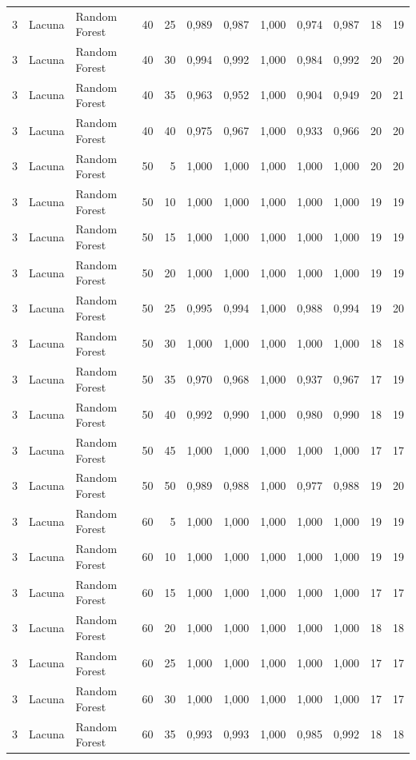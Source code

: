 \begin{longtable}{@{}rllrrrrrrrrr@{}}
3 & Lacuna & Random Forest & 40 & 25 & 0,989 & 0,987 & 1,000 & 0,974 & 0,987 & 18 & 19 \\
3 & Lacuna & Random Forest & 40 & 30 & 0,994 & 0,992 & 1,000 & 0,984 & 0,992 & 20 & 20 \\
3 & Lacuna & Random Forest & 40 & 35 & 0,963 & 0,952 & 1,000 & 0,904 & 0,949 & 20 & 21 \\
3 & Lacuna & Random Forest & 40 & 40 & 0,975 & 0,967 & 1,000 & 0,933 & 0,966 & 20 & 20 \\
3 & Lacuna & Random Forest & 50 & 5 & 1,000 & 1,000 & 1,000 & 1,000 & 1,000 & 20 & 20 \\
3 & Lacuna & Random Forest & 50 & 10 & 1,000 & 1,000 & 1,000 & 1,000 & 1,000 & 19 & 19 \\
3 & Lacuna & Random Forest & 50 & 15 & 1,000 & 1,000 & 1,000 & 1,000 & 1,000 & 19 & 19 \\
3 & Lacuna & Random Forest & 50 & 20 & 1,000 & 1,000 & 1,000 & 1,000 & 1,000 & 19 & 19 \\
3 & Lacuna & Random Forest & 50 & 25 & 0,995 & 0,994 & 1,000 & 0,988 & 0,994 & 19 & 20 \\
3 & Lacuna & Random Forest & 50 & 30 & 1,000 & 1,000 & 1,000 & 1,000 & 1,000 & 18 & 18 \\
3 & Lacuna & Random Forest & 50 & 35 & 0,970 & 0,968 & 1,000 & 0,937 & 0,967 & 17 & 19 \\
3 & Lacuna & Random Forest & 50 & 40 & 0,992 & 0,990 & 1,000 & 0,980 & 0,990 & 18 & 19 \\
3 & Lacuna & Random Forest & 50 & 45 & 1,000 & 1,000 & 1,000 & 1,000 & 1,000 & 17 & 17 \\
3 & Lacuna & Random Forest & 50 & 50 & 0,989 & 0,988 & 1,000 & 0,977 & 0,988 & 19 & 20 \\
3 & Lacuna & Random Forest & 60 & 5 & 1,000 & 1,000 & 1,000 & 1,000 & 1,000 & 19 & 19 \\
3 & Lacuna & Random Forest & 60 & 10 & 1,000 & 1,000 & 1,000 & 1,000 & 1,000 & 19 & 19 \\
3 & Lacuna & Random Forest & 60 & 15 & 1,000 & 1,000 & 1,000 & 1,000 & 1,000 & 17 & 17 \\
3 & Lacuna & Random Forest & 60 & 20 & 1,000 & 1,000 & 1,000 & 1,000 & 1,000 & 18 & 18 \\
3 & Lacuna & Random Forest & 60 & 25 & 1,000 & 1,000 & 1,000 & 1,000 & 1,000 & 17 & 17 \\
3 & Lacuna & Random Forest & 60 & 30 & 1,000 & 1,000 & 1,000 & 1,000 & 1,000 & 17 & 17 \\
3 & Lacuna & Random Forest & 60 & 35 & 0,993 & 0,993 & 1,000 & 0,985 & 0,992 & 18 & 18 \\

\end{longtable}
